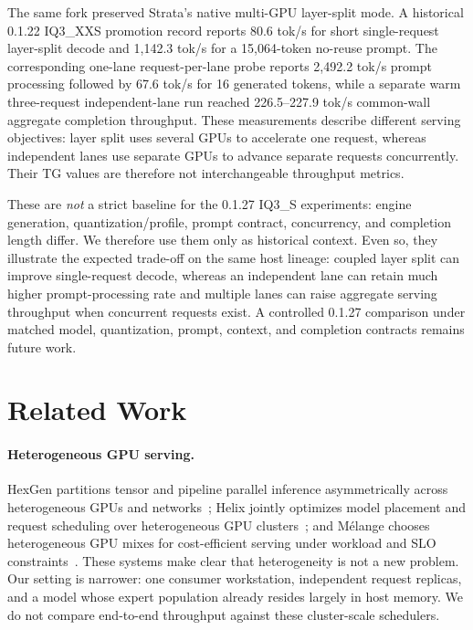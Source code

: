 The same fork preserved Strata's native multi-GPU layer-split mode. A historical 0.1.22 IQ3\_XXS promotion record reports 80.6 tok/s for short single-request layer-split decode and 1,142.3 tok/s for a 15,064-token no-reuse prompt. The corresponding one-lane request-per-lane probe reports 2,492.2 tok/s prompt processing followed by 67.6 tok/s for 16 generated tokens, while a separate warm three-request independent-lane run reached 226.5--227.9 tok/s common-wall aggregate completion throughput. These measurements describe different serving objectives: layer split uses several GPUs to accelerate one request, whereas independent lanes use separate GPUs to advance separate requests concurrently. Their TG values are therefore not interchangeable throughput metrics.

These are \emph{not} a strict baseline for the 0.1.27 IQ3\_S experiments: engine generation, quantization/profile, prompt contract, concurrency, and completion length differ. We therefore use them only as historical context. Even so, they illustrate the expected trade-off on the same host lineage: coupled layer split can improve single-request decode, whereas an independent lane can retain much higher prompt-processing rate and multiple lanes can raise aggregate serving throughput when concurrent requests exist. A controlled 0.1.27 comparison under matched model, quantization, prompt, context, and completion contracts remains future work.

\section{Related Work}
\paragraph{Heterogeneous GPU serving.}
HexGen partitions tensor and pipeline parallel inference asymmetrically across heterogeneous GPUs and networks~\cite{hexgen}; Helix jointly optimizes model placement and request scheduling over heterogeneous GPU clusters~\cite{helix}; and M\'elange chooses heterogeneous GPU mixes for cost-efficient serving under workload and SLO constraints~\cite{melange}. These systems make clear that heterogeneity is not a new problem. Our setting is narrower: one consumer workstation, independent request replicas, and a model whose expert population already resides largely in host memory. We do not compare end-to-end throughput against these cluster-scale schedulers.

